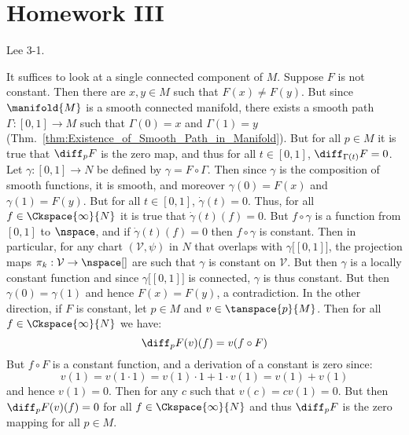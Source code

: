 \documentclass{article}                                                        %
\begin{document}
    \section{Homework III}
        \begin{problem}
            Lee 3-1.
        \end{problem}
        \begin{solution}
            It suffices to look at a single connected component of $M$. Suppose
            $F$ is not constant. Then there are $x,y\in{M}$ such that
            $F(x)\ne{F}(y)$. But since $\manifold{M}$ is a smooth connected
            manifold, there exists a smooth path $\Gamma:[0,1]\rightarrow{M}$
            such that $\Gamma(0)=x$ and $\Gamma(1)=y$
            (Thm.~\ref{thm:Existence_of_Smooth_Path_in_Manifold}). But for all
            $p\in{M}$ it is true that $\diff_{p}F$ is the zero map, and thus
            for all $t\in[0,1]$, $\diff_{\Gamma(t)}F=0$. Let
            $\gamma:[0,1]\rightarrow{N}$ be defined by
            $\gamma=F\circ\Gamma$. Then since $\gamma$ is the composition of
            smooth functions, it is smooth, and moreover $\gamma(0)=F(x)$ and
            $\gamma(1)=F(y)$. But for all $t\in[0,1]$,
            $\dot{\gamma}(t)=0$. Thus, for all $f\in\Ckspace{\infty}{N}$ it is
            true that $\dot{\gamma}(t)(f)=0$. But
            $f\circ\gamma$ is a function from $[0,1]$ to $\nspace$, and if
            $\dot{\gamma}(t)(f)=0$ then $f\circ\gamma$ is constant. Then in
            particular, for any chart $(\mathcal{V},\psi)$ in $N$ that overlaps
            with $\gamma\big[[0,1]\big]$, the projection maps
            $\pi_{k}:\mathcal{V}\rightarrow\nspace[]$ are such that $\gamma$
            is constant on $\mathcal{V}$. But then $\gamma$ is a locally
            constant function and since $\gamma\big[[0,1]\big]$ is connected,
            $\gamma$ is thus constant. But then $\gamma(0)=\gamma(1)$ and hence
            $F(x)=F(y)$, a contradiction. In the other direction, if $F$ is
            constant, let $p\in{M}$ and $v\in\tanspace{p}{M}$. Then for all
            $f\in\Ckspace{\infty}{N}$ we have:
            \begin{equation}
                \diff_{p}F(v)(f)=v(f\circ{F})
            \end{equation}
            But $f\circ{F}$ is a constant function, and a derivation of a
            constant is zero since:
            \begin{equation}
                v(1)=v(1\cdot{1})=v(1)\cdot{1}+1\cdot{v}(1)=v(1)+v(1)
            \end{equation}
            and hence $v(1)=0$. Then for any $c$ such that $v(c)=cv(1)=0$.
            But then $\diff_{p}F(v)(f)=0$ for all $f\in\Ckspace{\infty}{N}$ and
            thus $\diff_{p}F$ is the zero mapping for all $p\in{M}$.
        \end{solution}
\end{document}
